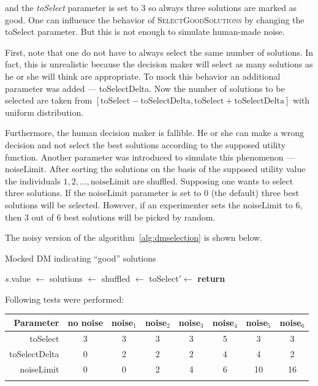 and the \textit{toSelect} parameter is set to $3$ so always three solutions
are marked as good. One can influence the behavior of
\textsc{SelectGoodSolutions} by changing the toSelect parameter. But this is
not enough to simulate human-made noise.

First, note that one do not have to always select the same number of
solutions. In fact, this is unrealistic because the decision maker will select
as many solutions as he or she will think are appropriate. To mock this
behavior an additional parameter was added --- toSelectDelta. Now the number
of solutions to be selected are taken from $[\text{toSelect} -
  \text{toSelectDelta}, \text{toSelect} + \text{toSelectDelta}]$ with uniform
distribution.

Furthermore, the human decision maker is fallible. He or she can make a wrong
decision and not select the best solutions according to the supposed utility
function. Another parameter was introduced to simulate this phenomenon ---
noiseLimit. After sorting the solutions on the basis of the supposed utility
value the individuals $1, 2, \dots, \text{noiseLimit}$ are shuffled. Supposing
one wants to select three solutions. If the noiseLimit parameter is set to $0$
(the default) three best solutions will be selected. However, if an
experimenter sets the noiseLimit to $6$, then $3$ out of $6$ best solutions
will be picked by random.

The noisy version of the algorithm~\ref{alg:dmselection} is shown below.
\begin{algorithm}
\caption{Mocked DM indicating ``good'' solutions}\label{alg:noisydmselection}
  \begin{algorithmic}[1]
    \State $s.$value $\gets$ 
    \EndFor
    \State solutions $\gets$ 
    \State shuffled $\gets$ 
    \State toSelect$' \gets$ 
    \State \textbf{return} 
    \EndProcedure
  \end{algorithmic}
\end{algorithm}

Following tests were performed:

\begin{tabular}{r c c c c c c c}
  \hline
  Parameter & no noise & noise$_1$ & noise$_2$ & noise$_3$ & noise$_4$ &
  noise$_5$ & noise$_6$ \\
  \hline
  \hline
  toSelect      & 3 & 3 & 3 & 3 & 5 &  3 &  3 \\
  toSelectDelta & 0 & 2 & 2 & 2 & 4 &  4 &  2 \\
  noiseLimit    & 0 & 0 & 2 & 4 & 6 & 10 & 16 \\
  \hline \\
\end{tabular}

